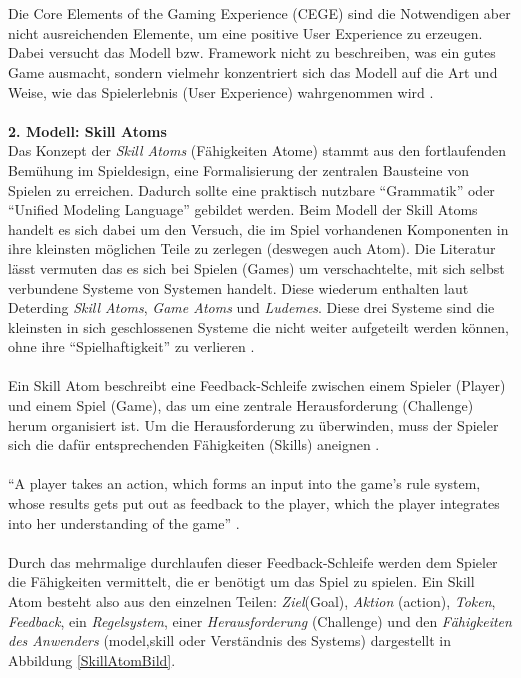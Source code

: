 \documentclass[a4paper,12pt]{scrartcl}
\begin{document}
\\\\
Die Core Elements of the Gaming Experience (CEGE) sind die Notwendigen aber nicht ausreichenden Elemente, um eine positive User Experience zu erzeugen. Dabei versucht das Modell bzw. Framework nicht zu beschreiben, was ein gutes Game ausmacht, sondern vielmehr konzentriert sich das Modell auf die Art und Weise, wie das Spielerlebnis (User Experience) wahrgenommen wird \cite{Cege2009}. 
\\\\
\textbf{2. Modell: Skill Atoms}\\
Das Konzept der \textit{Skill Atoms} (Fähigkeiten Atome) stammt aus den fortlaufenden
Bemühung im Spieldesign, eine Formalisierung der zentralen Bausteine von Spielen zu erreichen. Dadurch sollte eine praktisch nutzbare \enquote{Grammatik} oder \enquote{Unified Modeling Language} gebildet werden. Beim Modell der Skill Atoms handelt es sich dabei um den Versuch, die im Spiel vorhandenen Komponenten in ihre kleinsten möglichen Teile zu zerlegen (deswegen auch Atom). Die Literatur lässt vermuten das es sich bei Spielen (Games) um verschachtelte, mit sich selbst verbundene Systeme von Systemen handelt. Diese wiederum enthalten laut Deterding \textit{Skill Atoms}, \textit{Game Atoms} und \textit{Ludemes}. Diese drei Systeme sind die kleinsten in sich geschlossenen Systeme die nicht weiter aufgeteilt werden können, ohne ihre \enquote{Spielhaftigkeit} zu verlieren \cite{Deterding2013}.
\\\\
Ein Skill Atom beschreibt eine Feedback-Schleife zwischen einem Spieler (Player) und einem Spiel (Game), das um eine zentrale Herausforderung (Challenge) herum organisiert ist. Um die Herausforderung zu überwinden, muss der Spieler sich die dafür entsprechenden Fähigkeiten (Skills) aneignen \cite{SkillAtoms2006}.
\\\\
\enquote{A player takes an action, which forms an input into the game’s rule system, whose results gets put out as feedback to the player, which the player integrates into her understanding of the game} \cite{Deterding2013}.
\\\\
Durch das mehrmalige durchlaufen dieser Feedback-Schleife werden dem Spieler die Fähigkeiten vermittelt, die er benötigt um das Spiel zu spielen. Ein Skill Atom besteht also aus den einzelnen Teilen: \textit{Ziel}(Goal), \textit{Aktion} (action), \textit{Token}, \textit{Feedback}, ein \textit{Regelsystem}, einer \textit{Herausforderung} (Challenge) und den \textit{Fähigkeiten des Anwenders} (model,skill oder Verständnis des Systems) dargestellt in Abbildung \ref{SkillAtomBild}.    
\end{document}
